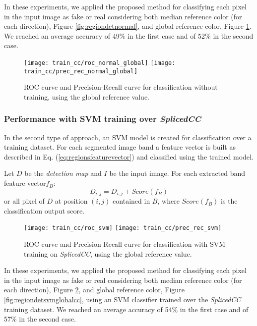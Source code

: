 In these experiments, we applied the proposed method for classifying each pixel in the input image as fake or real considering both median reference color (for each direction), Figure \ref{fig:regiondetnormal}, and global reference color, Figure \ref{fig:regiondetnormalglobal}. We reached an average accuracy of 49\% in the first case and of 52\% in the second case.

\begin{figure}[!htb]
  \texttt{[image: train\_cc/roc\_normal\_global]}
\endminipage\hfill
{}
  \texttt{[image: train\_cc/prec\_rec\_normal\_global]}
\endminipage
\caption{ROC curve and Precision-Recall curve for classification without training, using the global reference value.}\label{fig:regiondetnormalglobal}
\end{figure}

\subsubsection{Performance with SVM training over \emph{SplicedCC}}

In the second type of approach, an SVM model is created for classification over a training dataset. For each segmented image band a feature vector is built as described in Eq. (\ref{eq:regionsfeaturevector}) and classified using the trained model.

Let $D$ be the \emph{detection map} and $I$ be the input image. For each extracted band feature vector$f_B$:
$$
D_{i, j} = D_{i, j} + Score(f_B)
$$
or all pixel of $D$ at position $(i, j)$ contained in $B$, where $Score(f_B)$ is the classification output score.

\begin{figure}[!htb]
  \texttt{[image: train\_cc/roc\_svm]}
\endminipage\hfill
{}
  \texttt{[image: train\_cc/prec\_rec\_svm]}
\endminipage
\caption{ROC curve and Precision-Recall curve for classification with SVM training on \emph{SplicedCC}, using the global reference value.}\label{fig:regiondetsvmcc}
\end{figure}

In these experiments, we applied the proposed method for classifying each pixel in the input image as fake or real considering both median reference color (for each direction), Figure \ref{fig:regiondetsvmcc}, and global reference color, Figure \ref{fig:regiondetsvmglobalcc}, using an SVM classifier trained over the \emph{SplicedCC} training dataset. We reached an average accuracy of 54\% in the first case and of 57\% in the second case.

